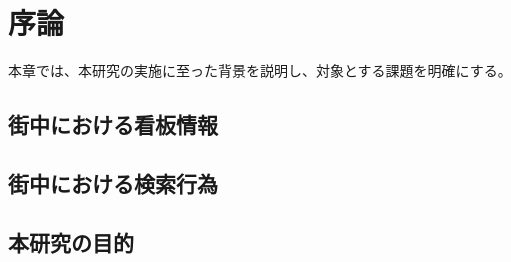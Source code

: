\chapter{序論}
\label{chapter:introduction}

本章では、本研究の実施に至った背景を説明し、対象とする課題を明確にする。

\section{街中における看板情報}

\section{街中における検索行為}

\section{本研究の目的}
